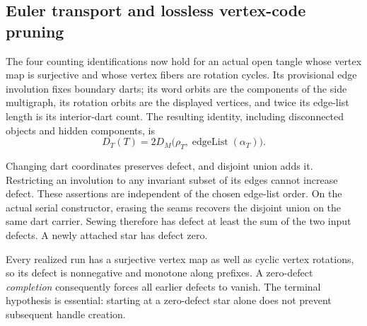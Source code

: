\subsection{Euler transport and lossless vertex-code pruning}
\label{sec:vertex-code-lossless-pruning}

The four counting identifications now hold for an actual open tangle whose
vertex map is surjective and whose vertex fibers are rotation cycles. Its
provisional edge involution fixes boundary darts; its word orbits are the
components of the side multigraph, its rotation orbits are the displayed
vertices, and twice its edge-list length is its interior-dart count. The
resulting identity, including disconnected objects and hidden components, is
\[
 D_T(T)=2D_M\bigl(\rho_T,\operatorname{edgeList}(\alpha_T)\bigr).
\]

Changing dart coordinates preserves defect, and disjoint union adds it.
Restricting an involution to any invariant subset of its edges cannot increase
defect. These assertions are independent of the chosen edge-list order.
On the actual serial constructor, erasing the seams recovers the disjoint
union on the same dart carrier. Sewing therefore has defect at least the
sum of the two input defects. A newly attached star has defect zero.

Every realized run has a surjective vertex map as well as cyclic vertex
rotations, so its defect is nonnegative and monotone along prefixes. A
zero-defect \emph{completion} consequently forces all earlier defects to
vanish. The terminal hypothesis is essential: starting at a zero-defect star
alone does not prevent subsequent handle creation.


